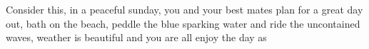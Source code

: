 Consider this, in a peaceful sunday, you and your best mates plan for a great day out, bath on the beach, peddle the blue sparking water and ride the uncontained waves, weather is beautiful and you are all enjoy the day as
